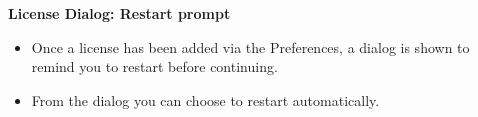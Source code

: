 \textbf{License Dialog: Restart prompt}
\begin{itemize}
\item Once a license has been added via the Preferences, a dialog is shown to remind you to restart \app{} before continuing. 
\item From the dialog you can choose to restart \app{} automatically.
\end{itemize}
